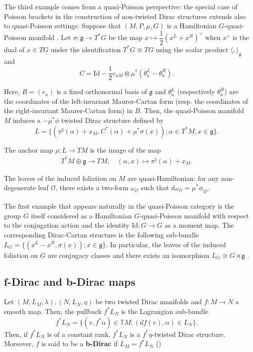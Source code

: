 \documentclass[reqno]{amsart}
\theoremstyle{plain}
\theoremstyle{definition}
\newcommand{\g}{\mathfrak{g}}
\newcommand{\too}{\longrightarrow}
\newcommand{\mtoo}{\longmapsto}
\renewcommand{\O}{\mathcal{O}}
\newcommand{\tM}{\mathbb{T}M}
\begin{document}
The third example comes from a quasi-Poisson perspective: the special case of Poisson brackets in the construction of non-twisted Dirac structures extends also to quasi-Poisson settings: Suppose that $(M,P,\mu,G)$ is a Hamiltonian $G$-quasi-Poisson manifold \cite[]{alekseev2002quasi}. Let $\sigma: \g \too T^{*}G$ be the map $x\mtoo \dfrac{1}{2}(x^{L} + x^{R})^{\vee}$ when $x^{\vee}$ is the dual of $x\in TG$ under the identification $T^{*}G \cong TG$ using the scalar product $\langle,  \rangle_{\g}$ and \[
C = \mathrm{Id} - \dfrac{1}{2}e_{aM}\otimes \mu^{*}(\theta^{L}_{a} - \theta^{R}_{a}).
\]

Here, $B = (e_{a})$ is a fixed orthonormal basis of $\g$ and $\theta^{L}_{a}$ (respectively $\theta^{R}_{a}$) are the coordinates of the left-invariant Maurer-Cartan form (resp. the coordinates of the right-invariant Maurer-Cartan form) in $B$. Then, the quasi-Poisson manifold $M$ induces a $-\mu^{*}\phi$ twisted Dirac structure \cite[]{bursztyn2007dirac} defined by \[ \label{Dirac qp}
L = \{(\pi^{\sharp}(\alpha) + x_{M}, C^{*}(\alpha) + \mu^{*}\sigma(x)); \alpha \in T^{*}M, x\in \g\}.
\]

The anchor map $\rho: L\too TM$ is the image of the map \begin{align*}
    T^{*}M \oplus \g \too TM, \quad (\alpha,x) \mtoo \pi^{\sharp}(\alpha) + x_{M}.
\end{align*}

The leaves of the induced foliation on $M$ are quasi-Hamiltonian: for any non-degenerate leaf $\O$, there exists a two-form $\omega_{\O}$ such that $d\omega_{\O} = \mu^{*}\phi_{|\O}.$

The first example that appears naturally in the quasi-Poisson category is the group $G$ itself considered as a Hamiltonian $G$-quasi-Poisson manifold with respect to the conjugation action and the identity $\mathrm{Id}: G\too G$ as a moment map. The corresponding Dirac-Cartan structure is the following sub-bundle $L_{G} = \{(x^{L} - x^{R}, \sigma(x)); x\in \g\}.$ In particular, the leaves of the induced foliation on $G$ are conjugacy classes and there exists an isomorphism $L_{G}\cong G \rtimes \g$ \cite[]{bursztyn2005dirac}. 


\subsection{f-Dirac and b-Dirac maps} Let $(M,L_{M},\lambda),(N,L_{N},\eta)$ be two twisted Dirac manifolds and $f: M \too N$ a smooth map. Then, the pullback $f^{*}L_{N}$ is the Lagrangian sub-bundle \[
f^{*}L_{N} = \{(v,f^{*}\alpha) \in \tM; (df(v),\alpha)\in L_{N}\}.
\] 
Then, if $f^{*}L_{N}$ is of a constant rank, $f^{*}L_{N}$ is a $f^{*}\eta$-twisted Dirac structure. Moreover, $f$ is said to be a \textbf{b-Dirac} if $L_{M} = f^{*}L_{N}$ (\cite[Subsection 1.3]{bualibanu2026reduction})\\
\end{document}
